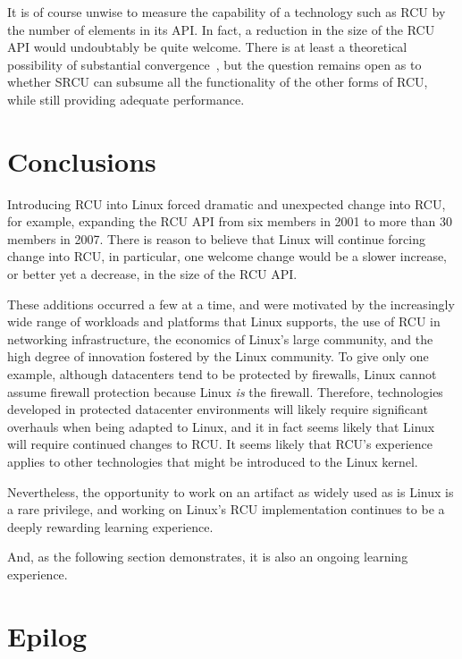 It is of course unwise to measure the capability of a technology such
as RCU by the number of elements in its API.
In fact, a reduction in the size of the RCU API would undoubtably be
quite welcome.
There is at least a theoretical possibility of substantial
convergence~\cite{ChristophHellwig2006RCU2SRCU},
but the question remains open as to whether SRCU can subsume all
the functionality of the other forms of RCU,
while still providing adequate performance.

\section{Conclusions}
\label{sec:app:rcuhist:Conclusions}

Introducing RCU into Linux forced dramatic and unexpected change into RCU,
for example, expanding the RCU API from six members in 2001
to more than 30 members in 2007.
There is reason to believe that Linux will continue forcing change
into RCU, in particular, one welcome change would be a slower increase, or
better yet a decrease, in the size of the RCU API.

These additions occurred a few at a time, and were motivated by
the increasingly wide range of workloads and platforms that
Linux supports,
the use of RCU in networking infrastructure,
the economics of Linux's large community,
and the high degree of innovation fostered by the Linux community.
To give only one example,
although datacenters tend to be protected by firewalls,
Linux cannot assume firewall protection because Linux \emph{is} the firewall.
Therefore, technologies developed in protected datacenter environments
will likely require significant overhauls when being adapted to Linux,
and it in fact seems likely that Linux will require continued changes
to RCU.
It seems likely that RCU's experience applies to other technologies
that might be introduced to the Linux kernel.

Nevertheless, the opportunity to work on an artifact as widely used as
is Linux is a rare privilege, and working on Linux's RCU implementation
continues to be a deeply rewarding learning experience.

And, as the following section demonstrates,
it is also an ongoing learning experience.

\section{Epilog}
\label{sec:app:rcuhist:Epilog}

